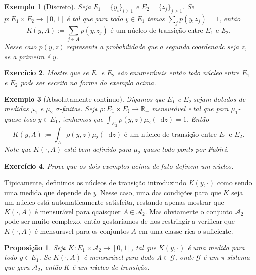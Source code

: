 \documentclass[reqno, final]{book}
\newcommand*\1{\mathds{1}}
\newtheorem{proposition}[theorem]{Proposição}
\newtheorem{example}{Exemplo}[section]
\newtheorem{exercise}[example]{Exercício}
\renewcommand*\d{\mathop{}\!\mathrm{d}}
\begin{document}
\begin{example}[Discreto]
  \label{x:nucleo_discreto}
  Seja $E_1 = \{y_i\}_{i \geq 1}$ e $E_2 = \{z_j\}_{j \geq 1}$.
  Se $p: E_1 \times E_2 \to [0,1]$ é tal que para todo $y \in E_1$ temos $\sum_{j} p(y, z_j) = 1$, então
  \begin{equation}
    K(y, A) := \sum_{j \in A} p(y, z_j) \text{ é um núcleo de transição entre $E_1$ e $E_2$.}
  \end{equation}
  Nesse caso $p(y,z)$ representa a probabilidade que a segunda coordenada seja $z$, se a primeira é $y$.
\end{example}

\begin{exercise}
  Mostre que se $E_1$ e $E_2$ são enumeráveis então todo núcleo entre $E_1$ e $E_2$ pode ser escrito na forma do exemplo acima.
\end{exercise}

\begin{example}[Absolutamente contínuo]
  Digamos que $E_1$ e $E_2$ sejam dotados de medidas $\mu_1$ e $\mu_2$ $\sigma$-finitas.
  Seja $\rho: E_1 \times E_2 \to \mathbb{R}_+$ mensurável e tal que para $\mu_1$-quase todo $y \in E_1$, tenhamos que $\int_{E_2} \rho(y, z) \mu_2(\d z) = 1$.
  Então
  \begin{equation}
    K(y, A) := \int_A \rho(y, z) \mu_2(\d z) \text{ é um núcleo de transição entre $E_1$ e $E_2$.}
  \end{equation}
  Note que $K(\cdot, A)$ está bem definido para $\mu_2$-quase todo ponto por Fubini.
\end{example}

\begin{exercise}
  Prove que os dois exemplos acima de fato definem um núcleo.
\end{exercise}

Tipicamente, definimos os núcleos de transição introduzindo $K(y, \cdot)$ como sendo uma medida que depende de $y$.
Nesse caso, uma das condições para que $K$ seja um núcleo está automaticamente satisfeita, restando apenas mostrar que $K(\cdot, A)$ é mensurável para quaisquer $A \in \mathcal{A}_2$.
Mas obviamente o conjunto $\mathcal{A}_2$ pode ser muito complexo, então gostaríamos de nos restringir a verificar que $K(\cdot, A)$ é mensurável para os conjuntos $A$ em uma classe rica o suficiente.

\begin{proposition}
  \label{p:K_nucleo_na_classe}
  Seja $K:E_1 \times \mathcal{A}_2 \to [0,1]$, tal que $K(y, \cdot)$ é uma medida para todo $y \in E_1$.
  Se $K(\cdot, A)$ é mensurável para dodo $A \in \mathcal{G}$, onde $\mathcal{G}$ é um $\pi$-sistema que gera $\mathcal{A}_2$, então $K$ é um núcleo de transição.
\end{proposition}
\end{document}
